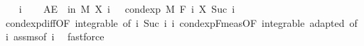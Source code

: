 \begin{isabellebody}
\ \ \isamarkupfalse%
\ i\isanewline
\ \ \isamarkupfalse%
\ {\isachardoublequoteopen}AE\ {\isasymxi}\ in\ M{\isachardot}{\kern0pt}\ X\ i\ {\isasymxi}\ {\isasymge}\ cond{\isacharunderscore}{\kern0pt}exp\ M\ {\isacharparenleft}{\kern0pt}F\ i{\isacharparenright}{\kern0pt}\ {\isacharparenleft}{\kern0pt}X\ {\isacharparenleft}{\kern0pt}Suc\ i{\isacharparenright}{\kern0pt}{\isacharparenright}{\kern0pt}\ {\isasymxi}{\isachardoublequoteclose}\ \isamarkupfalse%
\ cond{\isacharunderscore}{\kern0pt}exp{\isacharunderscore}{\kern0pt}diff{\isacharbrackleft}{\kern0pt}OF\ integrable{\isacharparenleft}{\kern0pt}{}{\isacharcomma}{\kern0pt}{}{\isacharparenright}{\kern0pt}{\isacharcomma}{\kern0pt}\ of\ i\ {\isachardoublequoteopen}Suc\ i{\isachardoublequoteclose}\ i{\isacharbrackright}{\kern0pt}\ cond{\isacharunderscore}{\kern0pt}exp{\isacharunderscore}{\kern0pt}F{\isacharunderscore}{\kern0pt}meas{\isacharbrackleft}{\kern0pt}OF\ integrable\ adapted{\isacharcomma}{\kern0pt}\ of\ i{\isacharbrackright}{\kern0pt}\ assms{\isacharparenleft}{\kern0pt}{}{\isacharparenright}{\kern0pt}{\isacharbrackleft}{\kern0pt}of\ i{\isacharbrackright}{\kern0pt}\ \isamarkupfalse%
\ fastforce\isanewline
{}\isamarkupfalse%
%
\endisatagproof
{\isafoldproof}%
%
\isadelimproof
\isanewline
%
\endisadelimproof
%
\isadelimtheory
\isanewline
%
\endisadelimtheory
%
\isatagtheory
{}\isamarkupfalse%
%
\endisatagtheory
{\isafoldtheory}%
%
\isadelimtheory
%
\endisadelimtheory
%
\end{isabellebody}%
\endinput
